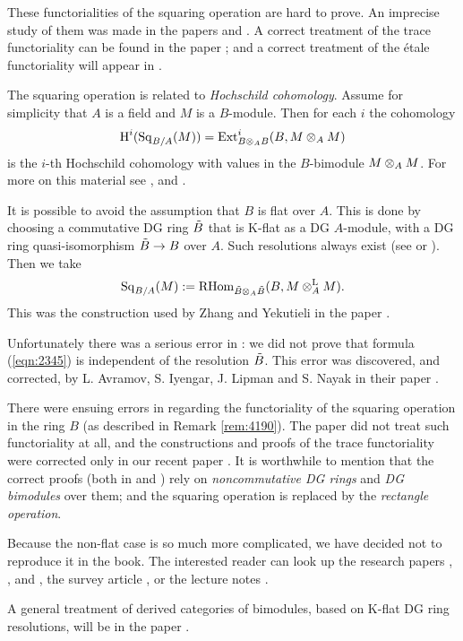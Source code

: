 \begin{rem}
These functorialities of the squaring operation are hard to prove. An imprecise 
study of them was made in the papers \cite{ YeZh3} and \cite{YeZh4}. 
A correct treatment of the trace functoriality can be found in the paper 
\cite{Ye9}; and a correct treatment of the \'etale functoriality will 
appear in \cite{Ye11}. 
\end{rem}

\begin{rem} \label{rem:2347}
The squaring operation is related to {\em Hochschild cohomology}.
Assume for simplicity that $A$ is a field and $M$ is a $B$-module. 
Then for each $i$ the cohomology 
\[ \operatorname{H}^i (\operatorname{Sq}_{B / A}(M)) = 
\operatorname{Ext}^i_{B \otimes_{A} B}(B, M \otimes_A M) \]
is the $i$-th Hochschild cohomology with values in the $B$-bimodule 
$M \otimes_A M$. 
For more on this material see \cite{AILN}, \cite{Sha1} and \cite{Sha2}. 
\end{rem}

\begin{rem} \label{rem:2285}
It is possible to avoid the assumption that $B$ is flat over $A$. 
This is done by choosing a commutative DG ring $\tilde{B}$ that is K-flat as a DG 
$A$-module, with a DG ring quasi-isomorphism $\tilde{B} \to B$ over $A$. 
Such resolutions always exist (see \cite{YeZh3} or \cite{Ye9}). Then we take 
\begin{equation} \label{eqn:2345}
\operatorname{Sq}_{B / A}(M) := 
\operatorname{RHom}_{\tilde{B} \otimes_{A} \tilde{B}}(B, M \otimes^{\mathrm{L}}_A M) .
\end{equation}
This was the construction used by Zhang and Yekutieli in the paper 
\cite{YeZh3}.

Unfortunately there was a serious error in \cite{YeZh3}: 
we did not prove that formula (\ref{eqn:2345}) is independent of  
the resolution $\tilde{B}$. This error was discovered, and corrected,
by L. Avramov, S. Iyengar, J. Lipman and S. Nayak in their paper \cite{AILN}. 

There were ensuing errors in \cite{YeZh3} regarding the functoriality of the 
squaring operation in the ring $B$ (as described in Remark \ref{rem:4190}). 
The paper \cite{AILN} did not treat such functoriality at all, and the 
constructions and proofs of the trace functoriality were corrected only 
in our recent paper \cite{Ye9}. It is worthwhile to mention that the correct 
proofs (both in \cite{AILN} and \cite{Ye9}) rely on {\em noncommutative DG 
rings} and {\em DG bimodules} over them; and the squaring operation is 
replaced by the {\em rectangle operation}. 

Because the non-flat case is so much more complicated, we have decided not to 
reproduce it in the book. The interested reader can look up the research papers 
\cite{Ye9}, \cite{Ye11}, \cite{Ye12} and \cite{Ye13}, the survey article 
\cite{Ye5}, or the lecture notes \cite{Ye10}. 

A general treatment of derived categories of bimodules, based on K-flat DG ring 
resolutions, will be in the paper \cite{Ye14}.
\end{rem}



